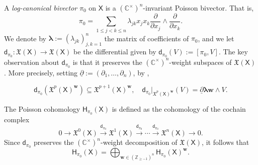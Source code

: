 \documentclass[11pt]{article}
\newcommand{\blambda}{\boldsymbol{\lambda}}
\newcommand{\bw}{\mathbf{w}}
\theoremstyle{definition}\newtheorem{definition}[theorem]{Definition}
\theoremstyle{definition}\newtheorem{remark}[theorem]{Remark}
\theoremstyle{remark}
\numberwithin{equation}{section}
\begin{document}
A \emph{log-canonical bivector} $\pi_0$ on $\mathsf{X}$ is a $(\mathbb{C}^\times)^n$-invariant Poisson bivector. That is,
\begin{equation*}
    \pi_0 = \sum_{1 \leq j < k \leq n} \lambda_{jk} x_j x_k \frac{\partial}{\partial x_j}\wedge \frac{\partial}{\partial x_k}.
\end{equation*}
We denote by $\blambda:=(\lambda_{jk})_{j,k=1}^n$ the matrix of coefficients of $\pi_0$, and we let $\mathsf{d}_{\pi_0} : \mathfrak{X}(\mathsf{X}) \rightarrow \mathfrak{X}(\mathsf{X})$ be the differential given by $\mathsf{d}_{\pi_0}(V) := [\pi_0,V]$. The key observation about $\mathsf{d}_{\pi_0}$ is that it preserves the $(\mathbb{C}^{\times})^n$-weight subspaces of $\mathfrak{X}(\mathsf{X})$. More precisely, setting $\underline{\partial}:=(\partial_1,\ldots,\partial_n)$, by \cite[Lemma 2.1.3]{lm-deform},

\begin{equation*}
    \mathsf{d}_{\pi_0}(\mathfrak{X}^p(\mathsf{X})^{\bw}) \subseteq \mathfrak{X}^{p+1}(\mathsf{X})^{\bw},\quad
    \mathsf{d}_{\pi_0}|_{\mathfrak{X}^p(\mathsf{X})^{\bw}}(V) = \underline{\partial}\blambda \bw \wedge V.
\end{equation*}

The Poisson cohomology $\mathsf{H}_{\pi_0}(\mathsf{X})$ is defined as the cohomology of the cochain complex
\begin{equation*}
    0 \rightarrow \mathfrak{X}^0(\mathsf{X}) \xrightarrow{\mathsf{d}_{\pi_0}} \mathfrak{X}^1(\mathsf{X}) \xrightarrow{\mathsf{d}_{\pi_0}} \cdots \xrightarrow{\mathsf{d}_{\pi_0}} \mathfrak{X}^n(\mathsf{X})\rightarrow 0.
\end{equation*}
Since $\mathsf{d}_{\pi_0}$ preserves the $(\mathbb{C}^{\times})^n$-weight decomposition of $\mathfrak{X}(\mathsf{X})$, it follows that
\begin{equation*}
    \mathsf{H}_{\pi_0}(\mathsf{X}) = \bigoplus_{\bw \in (\mathbb{Z}_{\geq -1})^n} \mathsf{H}_{\pi_0}(\mathsf{X})^{\bw}.
\end{equation*}
\end{document}
